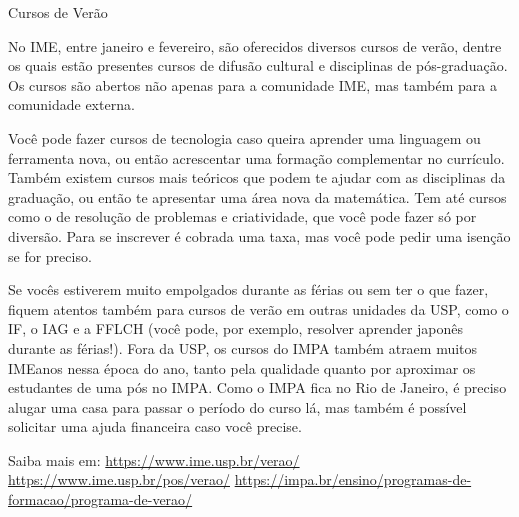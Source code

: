 \begin{secao}{Cursos de Verão}

No IME, entre janeiro e fevereiro, são oferecidos diversos cursos de verão,
dentre os quais estão presentes cursos de difusão cultural e disciplinas de
pós-graduação. Os cursos são abertos não apenas para a comunidade IME, mas
também para a comunidade externa.

Você pode fazer cursos de tecnologia caso queira aprender uma linguagem ou 
ferramenta nova, ou então acrescentar uma formação complementar no currículo. 
Também existem cursos mais teóricos que podem te ajudar com as disciplinas da 
graduação, ou então te apresentar uma área nova da matemática. Tem até cursos como
o de resolução de problemas e criatividade, que você pode fazer só por diversão. 
Para se inscrever é cobrada uma taxa, mas você pode pedir uma isenção se for preciso. 

Se vocês estiverem muito empolgados durante as férias ou sem ter o que fazer, 
fiquem atentos também para cursos de verão em outras unidades da USP, como o IF, o IAG 
e a FFLCH (você pode, por exemplo, resolver aprender japonês durante as férias!). Fora da 
USP, os cursos do IMPA também atraem muitos IMEanos nessa época do ano, tanto pela qualidade 
quanto por aproximar os estudantes de uma pós no IMPA. Como o IMPA fica no Rio de Janeiro, 
é preciso alugar uma casa para passar o período do curso lá, mas também é possível solicitar 
uma ajuda financeira caso você precise.


Saiba mais em: 
\url{https://www.ime.usp.br/verao/}
\url{https://www.ime.usp.br/pos/verao/}
\url{https://impa.br/ensino/programas-de-formacao/programa-de-verao/}

\end{secao}
